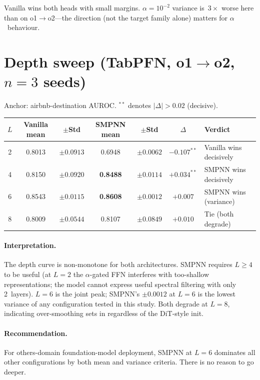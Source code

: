\documentclass{article}
\begin{document}
Vanilla wins both heads with small margins. $\alpha{=}10^{-2}$ variance is~$3\times$ worse here than on o1$\to$o2---the direction (not the target family alone) matters for $\alpha$~behaviour.

\section{Depth sweep (TabPFN, o1$\to$o2, $n{=}3$ seeds)}
\label{app:depth}

Anchor: airbnb-destination AUROC. $^{**}$ denotes $|\Delta| > 0.02$ (decisive).

\begin{table}[h]
  \centering
  \small
  \begin{tabular}{@{}ccccccl@{}}
    \toprule
    $L$ & Vanilla mean & $\pm$Std   & SMPNN mean       & $\pm$Std   & $\Delta$      & Verdict                     \\
    \midrule
    2   & 0.8013       & $\pm 0.0913$ & 0.6948            & $\pm 0.0062$ & $-0.107^{**}$ & Vanilla wins decisively    \\
    4   & 0.8150       & $\pm 0.0920$ & \textbf{0.8488}   & $\pm 0.0114$ & $+0.034^{**}$ & SMPNN wins decisively      \\
    6   & 0.8543       & $\pm 0.0115$ & \textbf{0.8608}   & $\pm 0.0012$ & $+0.007$      & SMPNN wins (variance)      \\
    8   & 0.8009       & $\pm 0.0544$ & 0.8107            & $\pm 0.0849$ & $+0.010$      & Tie (both degrade)         \\
    \bottomrule
  \end{tabular}
\end{table}

\paragraph{Interpretation.}
The depth curve is non-monotone for both architectures. SMPNN requires $L{\ge}4$ to be useful (at $L{=}2$ the $\alpha$-gated FFN interferes with too-shallow representations; the model cannot express useful spectral filtering with only 2~layers). $L{=}6$ is the joint peak; SMPNN's $\pm 0.0012$ at $L{=}6$ is the lowest variance of any configuration tested in this study. Both degrade at $L{=}8$, indicating over-smoothing sets in regardless of the DiT-style init.

\paragraph{Recommendation.}
For others-domain foundation-model deployment, SMPNN at $L{=}6$ dominates all other configurations by both mean and variance criteria. There is no reason to go deeper.
\end{document}
